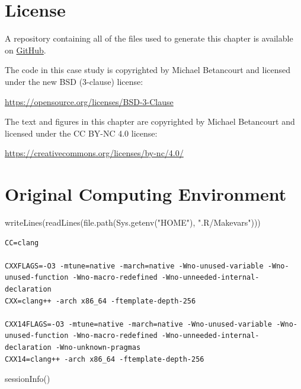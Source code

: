\documentclass[
  letterpaper,
  DIV=11,
  numbers=noendperiod]{scrartcl}
\newenvironment{Shaded}{\begin{snugshade}}{\end{snugshade}}
\newcommand{\FunctionTok}[1]{\textcolor[rgb]{0.28,0.35,0.67}{#1}}
\newcommand{\NormalTok}[1]{\textcolor[rgb]{0.00,0.23,0.31}{#1}}
\newcommand{\StringTok}[1]{\textcolor[rgb]{0.13,0.47,0.30}{#1}}
\begin{document}
\section*{License}\label{license}

A repository containing all of the files used to generate this chapter
is available on
\href{https://github.com/betanalpha/quarto_modeling_techniques/tree/main/ordinal_modeling}{GitHub}.

The code in this case study is copyrighted by Michael Betancourt and
licensed under the new BSD (3-clause) license:

\url{https://opensource.org/licenses/BSD-3-Clause}

The text and figures in this chapter are copyrighted by Michael
Betancourt and licensed under the CC BY-NC 4.0 license:

\url{https://creativecommons.org/licenses/by-nc/4.0/}

\section*{Original Computing
Environment}\label{original-computing-environment}

\begin{Shaded}
\begin{Highlighting}[]
\FunctionTok{writeLines}\NormalTok{(}\FunctionTok{readLines}\NormalTok{(}\FunctionTok{file.path}\NormalTok{(}\FunctionTok{Sys.getenv}\NormalTok{(}\StringTok{"HOME"}\NormalTok{), }\StringTok{".R/Makevars"}\NormalTok{)))}
\end{Highlighting}
\end{Shaded}

\begin{verbatim}
CC=clang

CXXFLAGS=-O3 -mtune=native -march=native -Wno-unused-variable -Wno-unused-function -Wno-macro-redefined -Wno-unneeded-internal-declaration
CXX=clang++ -arch x86_64 -ftemplate-depth-256

CXX14FLAGS=-O3 -mtune=native -march=native -Wno-unused-variable -Wno-unused-function -Wno-macro-redefined -Wno-unneeded-internal-declaration -Wno-unknown-pragmas
CXX14=clang++ -arch x86_64 -ftemplate-depth-256
\end{verbatim}

\begin{Shaded}
\begin{Highlighting}[]
\FunctionTok{sessionInfo}\NormalTok{()}
\end{Highlighting}
\end{Shaded}
\end{document}
